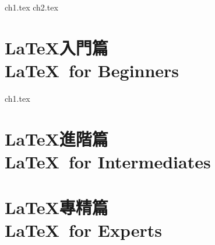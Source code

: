 \documentclass[12pt, a4paper, oneside]{extbook}
\let\tmpLaTeX\LaTeX
\renewcommand{\LaTeX}{\textrm{\tmpLaTeX}}
\begin{document}
	{ch1.tex}
	{ch2.tex}
	
	
	\part{\LaTeX 入門篇\\ \LaTeX\ for Beginners}
	{ch1.tex}
	
	\part{\LaTeX 進階篇\\ \LaTeX\ for Intermediates}
	
	\part{\LaTeX 專精篇\\ \LaTeX\ for Experts}
	
\end{document}
